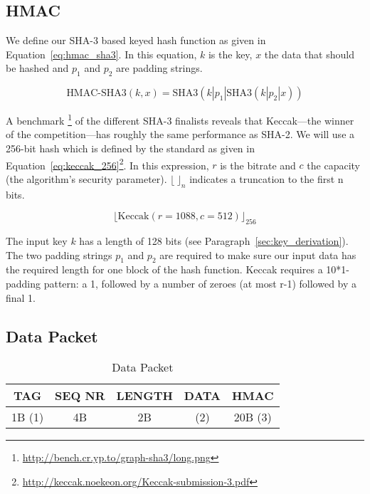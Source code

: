 \documentclass[a4paper]{article}
\begin{document}
\subsection{HMAC}

We define our SHA-3 based keyed hash function as given in Equation~\ref{eq:hmac_sha3}. In this equation, $k$ is the key, $x$ the data that should be hashed and $p_1$ and $p_2$ are padding strings.

\begin{equation} \label{eq:hmac_sha3}
    \text{HMAC-SHA3}(k, x) = \text{SHA3}(k | p_1 | \text{SHA3}(k | p_2 | x))
\end{equation}

A benchmark \footnote{\url{http://bench.cr.yp.to/graph-sha3/long.png}} of the different SHA-3 finalists reveals that Keccak---the winner of the competition---has roughly the same performance as SHA-2. We will use a 256-bit hash which is defined by the standard as given in Equation~\ref{eq:keccak_256}\footnote{\url{http://keccak.noekeon.org/Keccak-submission-3.pdf}}. In this expression, $r$ is the bitrate and $c$ the capacity (the algorithm's security parameter). ${\lfloor}{\ }{\rfloor}_n$ indicates a truncation to the first n bits.

\begin{equation} \label{eq:keccak_256}
    {\lfloor}\text{Keccak}(r = 1088, c = 512){\rfloor}_{256}
\end{equation}

The input key $k$ has a length of 128 bits (see Paragraph~\ref{sec:key_derivation}). The two padding strings $p_1$ and $p_2$ are required to make sure our input data has the required length for one block of the hash function. Keccak requires a 10*1-padding pattern: a 1, followed by a number of zeroes (at most r-1) followed by a final 1.

\subsection{Data Packet}

\begin{table}[H]
    \begin{center}
        \begin{tabular}{| c | c | c | c | c |}
            \hline
            TAG & SEQ NR & LENGTH & DATA & HMAC \\ \hline
            1B (1) & 4B & 2B & (2) & 20B (3) \\
            \hline
        \end{tabular}
    \end{center}
    
    \caption{Data Packet}
    \label{tab:data_packet}
\end{table}
\end{document}
